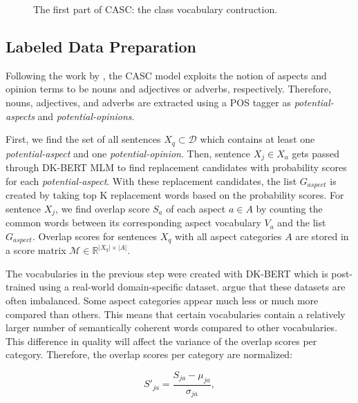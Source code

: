 \documentclass[american, oneside]{ecsgdp}
\begin{document}
\begin{figure}[htbp]
  \centering
  
  \caption{The first part of CASC: the class vocabulary contruction.}
  \label{fig:casc1}
\end{figure}

\subsection{Labeled Data Preparation} \label{sec:labeler}
Following the work by \textcite{Hu2004Rules}, the CASC model exploits the notion of aspects and opinion terms to be nouns and adjectives or adverbs, respectively. Therefore, nouns, adjectives, and adverbs are extracted using a POS tagger as \textit{potential-aspects} and \textit{potential-opinions}. %

First, we find the set of all sentences $X_q \subset \mathcal{D}$ which contains at least one \textit{potential-aspect} and one \textit{potential-opinion}. Then, sentence $X_j \in X_a$ gets passed through DK-BERT MLM to find replacement candidates with probability scores for each \textit{potential-aspect}. With these replacement candidates, the list $G_{aspect}$ is created by taking top K replacement words based on the probability scores. For sentence $X_j$, we find overlap score $S_a$ of each aspect $a \in A$ by counting the common words between its corresponding aspect vocabulary $V_a$ and the list $G_{aspect}$. Overlap scores for sentences $X_q$ with all aspect categories $A$ are stored in a score matrix $\mathcal{M} \in \mathbb{R}^{\lvert X_q \rvert \times \lvert A \rvert}$.


The vocabularies in the previous step were created with DK-BERT which is post-trained using a real-world domain-specific dataset. \textcite{Kumar2021CASC} argue that these datasets are often imbalanced. Some aspect categories appear much less or much more compared than others. This means that certain vocabularies contain a relatively larger number of semantically coherent words compared to other vocabularies. This difference in quality will affect the variance of the overlap scores per category. Therefore, the overlap scores per category are normalized:

\begin{equation}
    S'_{ja} = \frac{S_{ja} - \mu_{ja}}{\sigma_{ja}},
\end{equation}
\end{document}
